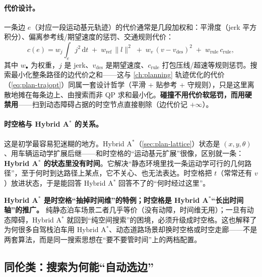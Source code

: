 \paragraph{代价设计。}
一条边 $e$（对应一段运动基元轨迹）的代价通常是几段加权和：平滑度（jerk 平方积分）、偏离参考线/期望速度的惩罚、交通规则代价：
\begin{equation}
  c(e)=w_j\!\int_e\! j^2\,\mathrm{d}t \;+\; w_{\mathrm{ref}}\,\|l\|^2 \;+\; w_v\,(v-v_{\mathrm{des}})^2 \;+\; w_{\mathrm{rule}}\,c_{\mathrm{rule}},
  \label{eq:stc-edge-cost}
\end{equation}
其中 $w_\bullet$ 为权重，$j$ 是 jerk、$v_{\mathrm{des}}$ 是期望速度、$c_{\mathrm{rule}}$ 打包压线/超速等规则惩罚\cite{ziegler2009spatiotemporal}。搜索最小化整条路径的边代价之和——这与 \cref{ch:planning} 轨迹优化的代价（\cref{eq:plan-trajopt}）同属一套设计哲学（平滑 + 贴参考 + 守规则），只是这里离散地摊在每条边上、由搜索而非 QP 求和最小化。\textbf{碰撞不用代价软惩罚，而用硬禁用}——扫到动态障碍占据的时空节点直接剔除（边代价记 $+\infty$）。

\paragraph{时空格与 Hybrid A$^*$ 的关系。}
这是初学最容易犯迷糊的地方。Hybrid A$^*$（\cref{sec:plan-lattice}）状态是 $(x,y,\theta)$、用车辆运动学扩展后继——和时空格的“运动基元扩展”很像，区别就一条：\textbf{Hybrid A$^*$ 的状态里没有时间}。它解决“静态环境里找一条运动学可行的几何路径”，至于何时到达路径上某点，它不关心、也无法表达。时空格把 $t$（常常还有 $v$）放进状态，于是能回答 Hybrid A$^*$ 回答不了的“何时经过这里”。
\begin{insight}
\textbf{Hybrid A$^*$ 是时空格“抽掉时间维”的特例；时空格是 Hybrid A$^*$“长出时间轴”的推广。}\;
纯静态泊车场景二者几乎等价（没有动障，时间维无用）；一旦有动态障碍，Hybrid A$^*$ 就回到“纯空间搜索”的困境，必须升级成时空格。这也解释了为何很多自驾栈泊车用 Hybrid A$^*$、动态道路场景却换时空格或时空走廊——不是两套算法，而是同一搜索思想在“要不要管时间”上的两档配置。
\end{insight}

\subsection{同伦类：搜索为何能“自动选边”}
\label{sec:stc-homotopy}

